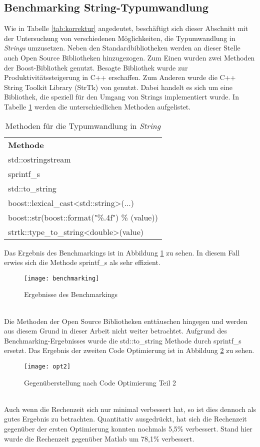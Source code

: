 \subsection{Benchmarking String-Typumwandlung}
\label{sec:bench}
Wie in Tabelle \ref{tab:korrektur} angedeutet, beschäftigt sich dieser Abschnitt mit der Untersuchung von verschiedenen Möglichkeiten, die Typumwandlung in \textit{Strings} umzusetzen. Neben den Standardbibliotheken werden an dieser Stelle auch Open Source Bibliotheken hinzugezogen. Zum Einen wurden zwei Methoden der Boost-Bibliothek \cite{C++StandardsCommittees.2018} genutzt. Besagte Bibliothek wurde zur Produktivitätssteigerung in C++ erschaffen. Zum Anderen wurde die C++ String Toolkit Library (StrTk) von \cite{Partow.2018} genutzt. Dabei handelt es sich um eine Bibliothek, die speziell für den Umgang von Strings implementiert wurde. In Tabelle \ref{tab:benchmarking} werden die unterschiedlichen Methoden aufgelistet. 
\begin{table}[h]
	\centering\begin{tabular}{l}
		\textbf{Methode}  \\
			std::ostringstream \\
			sprintf\_s \\
			std::to\_string\\
			boost::lexical\_cast<std::string>(...)\\
			boost::str(boost::format("\%.4f") \% (value))\\
			strtk::type\_to\_string<double>(value)
			\end{tabular}
	\caption{Methoden für die Typumwandlung in \textit{String}}
\label{tab:benchmarking}
\end{table}\newpage
Das Ergebnis des Benchmarkings ist in Abbildung \ref{fig:benchmarking} zu sehen. In diesem Fall erwies sich die Methode sprintf\_s als sehr effizient.\\
\begin{figure}[h]
	\centering
	\texttt{[image: benchmarking]}
	\caption{Ergebnisse des Benchmarkings}
	\label{fig:benchmarking}
\end{figure}\noindent\\
 Die Methoden der Open Source Bibliotheken enttäuschen hingegen und werden aus diesem Grund in dieser Arbeit nicht weiter betrachtet. Aufgrund des Benchmarking-Ergebnisses wurde die std::to\_string Methode durch sprintf\_s ersetzt. Das Ergebnis der zweiten Code Optimierung ist in Abbildung \ref{fig:opt2} zu sehen.\\
\begin{figure}[h]
	\centering
	\texttt{[image: opt2]}
	\caption{Gegenüberstellung nach Code Optimierung Teil 2}
	\label{fig:opt2}
\end{figure}\noindent\\
Auch wenn die Rechenzeit sich nur minimal verbessert hat, so ist dies dennoch als gutes Ergebnis zu betrachten. Quantitativ ausgedrückt, hat sich die Rechenzeit gegenüber der ersten Optimierung konnten nochmals 5,5\% verbessert. Stand hier wurde die Rechenzeit gegenüber Matlab um 78,1\% verbessert.
